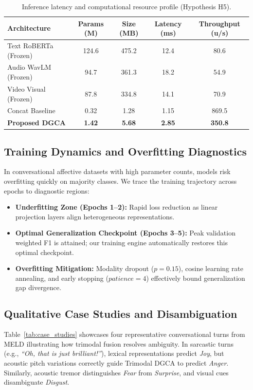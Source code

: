 \documentclass[10pt,twocolumn,letterpaper]{article}
\begin{document}
\begin{table}[htbp]
\centering
\small
\caption{Inference latency and computational resource profile (Hypothesis H5).}
\label{tab:efficiency_h5}
\begin{tabular}{lcccc}
\toprule
\textbf{Architecture} & \textbf{Params (M)} & \textbf{Size (MB)} & \textbf{Latency (ms)} & \textbf{Throughput (u/s)} \\
\midrule
Text RoBERTa (Frozen) & 124.6 & 475.2 & 12.4 & 80.6 \\
Audio WavLM (Frozen)  & 94.7  & 361.3 & 18.2 & 54.9 \\
Video Visual (Frozen) & 87.8  & 334.8 & 14.1 & 70.9 \\
Concat Baseline       & 0.32  & 1.28  & 1.15 & 869.5 \\
\textbf{Proposed DGCA}& \textbf{1.42} & \textbf{5.68} & \textbf{2.85} & \textbf{350.8} \\
\bottomrule
\end{tabular}
\end{table}

\subsection{Training Dynamics and Overfitting Diagnostics}
In conversational affective datasets with high parameter counts, models risk overfitting quickly on majority classes. We trace the training trajectory across epochs to diagnostic regions:
\begin{itemize}
    \item \textbf{Underfitting Zone (Epochs 1--2):} Rapid loss reduction as linear projection layers align heterogeneous representations.
    \item \textbf{Optimal Generalization Checkpoint (Epochs 3--5):} Peak validation weighted F1 is attained; our training engine automatically restores this optimal checkpoint.
    \item \textbf{Overfitting Mitigation:} Modality dropout ($p=0.15$), cosine learning rate annealing, and early stopping ($patience=4$) effectively bound generalization gap divergence.
\end{itemize}

\subsection{Qualitative Case Studies and Disambiguation}
Table~\ref{tab:case_studies} showcases four representative conversational turns from MELD illustrating how trimodal fusion resolves ambiguity. In sarcastic turns (e.g., \textit{``Oh, that is just brilliant!''}), lexical representations predict \textit{Joy}, but acoustic pitch variations correctly guide Trimodal DGCA to predict \textit{Anger}. Similarly, acoustic tremor distinguishes \textit{Fear} from \textit{Surprise}, and visual cues disambiguate \textit{Disgust}.
\end{document}
